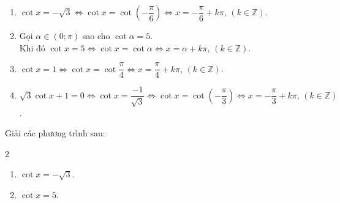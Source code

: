 \begin{bt}
{\begin{enumerate}
			\item $\cot x=-\sqrt{3}\Leftrightarrow\cot x=\cot\left(-\dfrac{\pi}{6}\right)\Leftrightarrow x=-\dfrac{\pi}{6}+k\pi,\,(k\in\mathbb{Z})$.
			\item Gọi $\alpha\in\left(0;\pi\right)$ sao cho $\cot\alpha=5$.\\Khi đó $\cot x=5\Leftrightarrow\cot x=\cot\alpha\Leftrightarrow x=\alpha+k\pi,\,(k\in\mathbb{Z})$.
			\item $\cot x=1\Leftrightarrow\cot x=\cot\dfrac{\pi}{4}\Leftrightarrow x=\dfrac{\pi}{4}+k\pi,\,(k\in\mathbb{Z})$.
			\item $\sqrt{3}\cot x+1=0\Leftrightarrow\cot x=\dfrac{-1}{\sqrt{3}}\Leftrightarrow\cot x=\cot\left(-\dfrac{\pi}{3}\right)\Leftrightarrow x=-\dfrac{\pi}{3}+k\pi,\,(k\in\mathbb{Z})$.
	\end{enumerate}}
\end{bt}

\begin{bt}%
	Giải các phương trình sau:
	\begin{multicols}{2}
	\begin{enumerate}
		\item $\cot x=-\sqrt{3}$.
		\item  $\cot x=5$.
	\end{enumerate}
	\end{multicols}
\end{bt}

